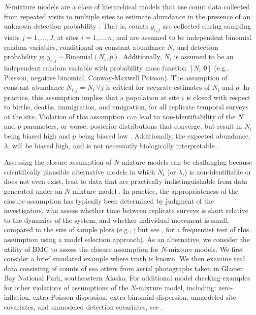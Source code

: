 \documentclass[12pt,english]{article}
\begin{document}
\begin{spacing}{1.9}
$N$-mixture models are a class of hierarchical models that use count
data collected from repeated visits to multiple sites to estimate
abundance in the presence of an unknown detection probability
\citep{Royle2004a}. That is, counts $y_{i,j}$ are collected during
sampling visits $j=1,\ldots,J$, at sites $i=1,\ldots,n$, and are
assumed to be independent binomial random variables, conditional on
constant abundance $N_i$ and detection probability $p$;
$y_{i,j} \sim \text{Binomial}(N_i,p)$. Additionally, $N_i$ is assumed
to be an independent random variable with probability mass function
$[N_i|\boldsymbol{\theta}]$ (e.g., Poisson, negative binomial,
Conway-Maxwell Poisson).  The assumption of constant abundance
$N_{i,j}=N_i~ \forall j$ is critical for accurate estimates of $N_i$
and $p$. In practice, this assumption implies that a population at
site $i$ is closed with respect to births, deaths, immigration, and
emigration, for all replicate temporal surveys at the site. Violation
of this assumption can lead to non-identifiability of the $N$ and $p$
parameters, or worse, posterior distributions that converge, but
result in $N_i$ being biased high and $p$ being biased low
\citep[Apendix C]{kery2015applied}. Additionally, the expected
abundance, $\lambda$, will be biased high, and is not necessarily
biologically interpretable \citep[e.g., it does not necessarily
provide an estimate of the total number of individuals ever associated
with a site, c.f. \emph{superpopulation};][]{kery2015applied}.

Assessing the closure assumption of $N$-mixture models can be
challanging because scientifically plausible alternative models in
which $N_i$ (or $\lambda_i$) is non-identifiable or does not even
exist, lead to data that are practically indistinguishable from data
generated under an $N$-mixture model \citep{barker2016n}. In practice,
the appropriateness of the closure assumption has typically been
determined by judgment of the investigators, who assess whether time
between replicate surveys is short relative to the dynamics of the
system, and whether individual movement is small, compared to the size
of sample plots (e.g., \citealt{efford2012occupancy}; but see
\citealt{DailMadsen2011}, for a frequentist test of this assumption
using a model selection approach). As an alternative, we consider the
utility of BMC to assess the closure assumption
for $N$-mixture models. We first consider a brief simulated example
where truth is known. We then examine real data consisting of counts
of sea otters from aerial photographs taken in Glacier Bay National
Park, southeastern Alaska. For additional model checking examples for
other violations of assumptions of the $N$-mixture model, including:
zero-inflation, extra-Poisson dispersion, extra-binomial dispersion,
unmodeled site covariates, and unmodeled detection covariates, see
\citet[][section 6.8]{kery2015applied}.


\end{spacing}
\end{document}
